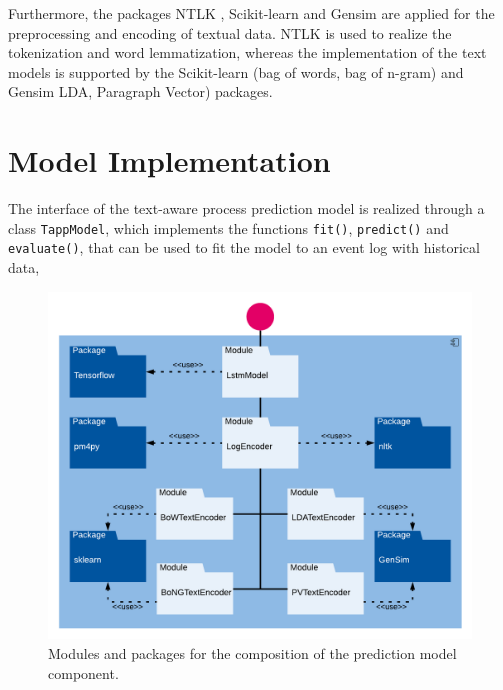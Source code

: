 Furthermore, the packages NTLK \cite{DBLP:books/daglib/0022921}, Scikit-learn \cite{DBLP:journals/jmlr/PedregosaVGMTGBPWDVPCBPD11} and Gensim \cite{rehurek_lrec} are applied for the preprocessing and encoding of textual data.
NTLK is used to realize the tokenization and word lemmatization, whereas the implementation of the text models is supported by the Scikit-learn (bag of words, bag of n-gram) and Gensim LDA, Paragraph Vector) packages.


\section{Model Implementation}

The interface of the text-aware process prediction model is realized through a class \texttt{TappModel}, which implements the functions \texttt{fit()},  \texttt{predict()} and  \texttt{evaluate()}, that can be used to fit the model to an event log with historical data, 

\begin{figure}[htbp!]
	\centering
	\includegraphics[width=\textwidth]{figures/implementation}
	\caption[Composition of the prediction model]{Modules and packages for the composition of the prediction model component.}
	\label{fig:/implementation}
\end{figure}
